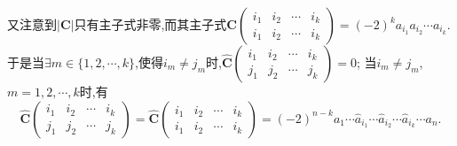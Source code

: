 \documentclass[../../main.tex]{subfiles}
\begin{document}
\begin{solution}
\begin{enumerate}[(1)]
又注意到\(|\boldsymbol{C}|\)只有主子式非零,而其主子式\(\boldsymbol{C}\left(\begin{matrix}
i_1 & i_2 & \cdots & i_k\\
i_1 & i_2 & \cdots & i_k
\end{matrix}\right) = (-2)^ka_{i_1}a_{i_2}\cdots a_{i_k}\).
于是当\(\exists m\in \{1,2,\cdots,k\}\),使得\(i_m\neq j_m\)时,\(\widehat{\boldsymbol{C}}\left(\begin{matrix}
i_1 & i_2 & \cdots & i_k\\
j_1 & j_2 & \cdots & j_k
\end{matrix}\right) = 0\);
当\(i_m\neq j_m\),\(m = 1,2,\cdots,k\)时,有\[\widehat{\boldsymbol{C}}\left(\begin{matrix}
i_1 & i_2 & \cdots & i_k\\
j_1 & j_2 & \cdots & j_k
\end{matrix}\right) = \widehat{\boldsymbol{C}}\left(\begin{matrix}
i_1 & i_2 & \cdots & i_k\\
i_1 & i_2 & \cdots & i_k
\end{matrix}\right) = (-2)^{n - k}a_1\cdots \hat{a}_{i_1}\cdots \hat{a}_{i_2}\cdots \hat{a}_{i_k}\cdots a_n.\]


\end{enumerate}
\end{solution}
\end{document}
